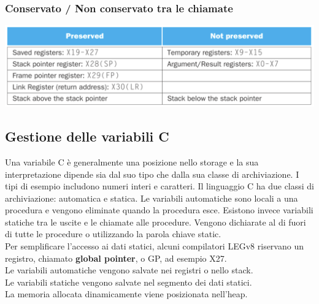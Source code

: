 \documentclass[12pt,a4paper]{article}
\begin{document}
\subsubsection{Conservato / Non conservato tra le chiamate}
\begin{center}
\includegraphics[width=0.7\columnwidth]{img/preserved.png}
\end{center}

\subsection{Gestione delle variabili C}
Una variabile C è generalmente una posizione nello storage e la sua interpretazione dipende sia dal suo tipo che dalla sua classe di archiviazione. I tipi di esempio includono numeri interi e caratteri. Il linguaggio C ha due classi di archiviazione: automatica e statica. Le variabili automatiche sono locali a una procedura e vengono eliminate quando la procedura esce. Esistono invece variabili statiche tra le uscite e le chiamate alle procedure. Vengono dichiarate al di fuori di tutte le procedure o utilizzando la parola chiave static.\\
Per semplificare l'accesso ai dati statici, alcuni compilatori LEGv8 riservano un registro, chiamato \textbf{global pointer}, o GP, ad esempio X27.\\
Le variabili automatiche vengono salvate nei registri o nello stack.\\
Le variabili statiche vengono salvate nel segmento dei dati statici.\\
La memoria allocata dinamicamente viene posizionata nell'heap.\\
\end{document}
